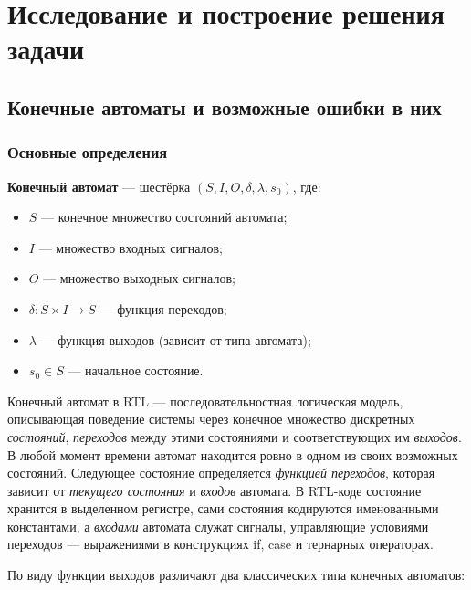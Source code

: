 \section{Исследование и построение решения задачи}
\label{sec:Chapter3} 

\subsection{Конечные автоматы и возможные ошибки в них}

\subsubsection{Основные определения}

\textbf{Конечный автомат} --- шестёрка $(S, I, O, \delta, \lambda, s_0)$, где:

\begin{itemize}
    \item $S$ --- конечное множество состояний автомата;
    \item $I$ --- множество входных сигналов;
    \item $O$ --- множество выходных сигналов;
    \item $\delta : S \times I \rightarrow S$ --- функция переходов;
    \item $\lambda$ --- функция выходов (зависит от типа автомата);
    \item $s_0 \in S$ — начальное состояние.
\end{itemize}

Конечный автомат в RTL --- последовательностная логическая модель, описывающая поведение системы
через конечное множество дискретных \textit{состояний}, \textit{переходов} между этими состояниями
и соответствующих им \textit{выходов}. В любой момент времени автомат находится ровно в
одном из своих возможных состояний. Следующее состояние определяется \textit{функцией переходов},
которая зависит от \textit{текущего состояния} и \textit{входов}
автомата. В RTL-коде состояние хранится в выделенном регистре, сами состояния кодируются именованными
константами, а \textit{входами} автомата служат сигналы, управляющие условиями переходов ---
выражениями в конструкциях if, case и тернарных операторах.

По виду функции выходов различают два классических типа конечных автоматов:

